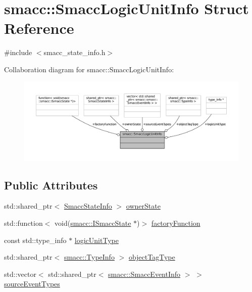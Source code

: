 \hypertarget{structsmacc_1_1SmaccLogicUnitInfo}{}\section{smacc\+:\+:Smacc\+Logic\+Unit\+Info Struct Reference}
\label{structsmacc_1_1SmaccLogicUnitInfo}


{\ttfamily \#include $<$smacc\+\_\+state\+\_\+info.\+h$>$}



Collaboration diagram for smacc\+:\+:Smacc\+Logic\+Unit\+Info\+:
\nopagebreak
\begin{figure}[H]
\begin{center}
\leavevmode
\includegraphics[width=350pt]{structsmacc_1_1SmaccLogicUnitInfo__coll__graph}
\end{center}
\end{figure}
\subsection*{Public Attributes}
\begin{DoxyCompactItemize}
\item 
std\+::shared\+\_\+ptr$<$ \hyperlink{classsmacc_1_1SmaccStateInfo}{Smacc\+State\+Info} $>$ \hyperlink{structsmacc_1_1SmaccLogicUnitInfo_a5584c7f4dac1938c089e8f9a2631ff6e}{owner\+State}
\item 
std\+::function$<$ void(\hyperlink{classsmacc_1_1ISmaccState}{smacc\+::\+I\+Smacc\+State} $\ast$)$>$ \hyperlink{structsmacc_1_1SmaccLogicUnitInfo_a2d4291cbae69ced8549ce7cd6c5e6820}{factory\+Function}
\item 
const std\+::type\+\_\+info $\ast$ \hyperlink{structsmacc_1_1SmaccLogicUnitInfo_a23f4cb45a6502b1493afec8eb28c9d71}{logic\+Unit\+Type}
\item 
std\+::shared\+\_\+ptr$<$ \hyperlink{classsmacc_1_1TypeInfo}{smacc\+::\+Type\+Info} $>$ \hyperlink{structsmacc_1_1SmaccLogicUnitInfo_a3950a3dd81640dfe1e8eaebd2870dabb}{object\+Tag\+Type}
\item 
std\+::vector$<$ std\+::shared\+\_\+ptr$<$ \hyperlink{structsmacc_1_1SmaccEventInfo}{smacc\+::\+Smacc\+Event\+Info} $>$ $>$ \hyperlink{structsmacc_1_1SmaccLogicUnitInfo_ab753c234942c41eb973873f9222b9fd9}{source\+Event\+Types}
\end{DoxyCompactItemize}


